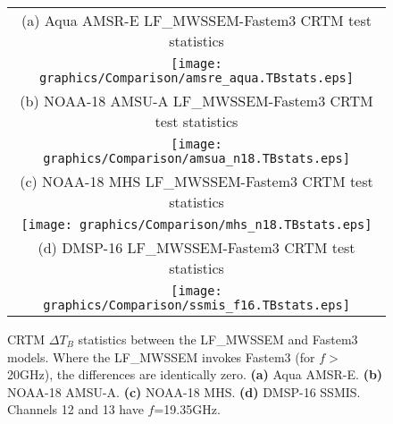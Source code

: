 \begin{figure}[htp]
  \centering
  \begin{tabular}{c}
    \textsf{(a) Aqua AMSR-E LF\_MWSSEM-Fastem3 CRTM test statistics}\\
    \texttt{[image: graphics/Comparison/amsre\_aqua.TBstats.eps]}\\
    \textsf{(b) NOAA-18 AMSU-A LF\_MWSSEM-Fastem3 CRTM test statistics}\\
    \texttt{[image: graphics/Comparison/amsua\_n18.TBstats.eps]}\\
    \textsf{(c) NOAA-18 MHS LF\_MWSSEM-Fastem3 CRTM test statistics}\\
    \texttt{[image: graphics/Comparison/mhs\_n18.TBstats.eps]}\\
    \textsf{(d) DMSP-16 LF\_MWSSEM-Fastem3 CRTM test statistics}\\
    \texttt{[image: graphics/Comparison/ssmis\_f16.TBstats.eps]}
  \end{tabular}
  \caption{CRTM $\Delta T_B$ statistics between the LF\_MWSSEM and Fastem3 models. Where the LF\_MWSSEM invokes Fastem3 (for $f\!>$20GHz), the differences are identically zero. \textbf{(a)} Aqua AMSR-E. \textbf{(b)} NOAA-18 AMSU-A. \textbf{(c)} NOAA-18 MHS. \textbf{(d)} DMSP-16 SSMIS. Channels 12 and 13 have $f$=19.35GHz.}
  \label{fig:LF_MWSSEM-Fastem3.TBstats}
\end{figure}


